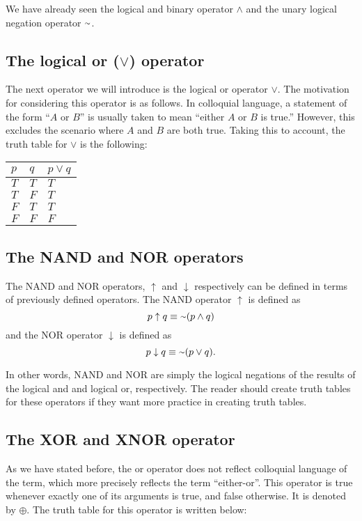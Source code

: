 We have already seen the logical and binary operator $\land$ and the unary logical negation operator $\shortsim$. 

\subsection{The logical or ($\lor$) operator}
The next operator we will introduce is the logical or operator $\lor$. The motivation for considering this operator is as follows. In colloquial language, a statement of the form ``$A$ or $B$'' is usually taken to mean ``either $A$ or $B$ is true.'' However, this excludes the scenario where $A$ and $B$ are both true. Taking this to account, the truth table for $\lor$ is the following:

\begin{table}[h]
\centering
\begin{tabular}{|l|l|l|}
\hline 
$p$ & $q$ & $p \lor q$ \\ \hline
$T$ & $T$ & $T$ \\ \hline
$T$ & $F$ & $T$ \\ \hline
$F$ & $T$ & $T$ \\ \hline
$F$ & $F$ & $F$ \\ \hline
\end{tabular}
\end{table}

\subsection{The NAND and NOR operators}
The NAND and NOR operators, $\uparrow$ and $\downarrow$ respectively can be defined in terms of previously defined operators. The NAND operator $\uparrow$ is defined as
\[p \uparrow q \equiv \shortsim(p \land q)\]
and the NOR operator $\downarrow$ is defined as
\[p \downarrow q \equiv \shortsim(p \lor q).\]

In other words, NAND and NOR are simply the logical negations of the results of the logical and and logical or, respectively. The reader should create truth tables for these operators if they want more practice in creating truth tables.

\subsection{The XOR and XNOR operator}
As we have stated before, the or operator does not reflect colloquial language of the term, which more precisely reflects the term ``either-or''. This operator is true whenever exactly one of its arguments is true, and false otherwise. It is denoted by $\oplus$. The truth table for this operator is written below:

